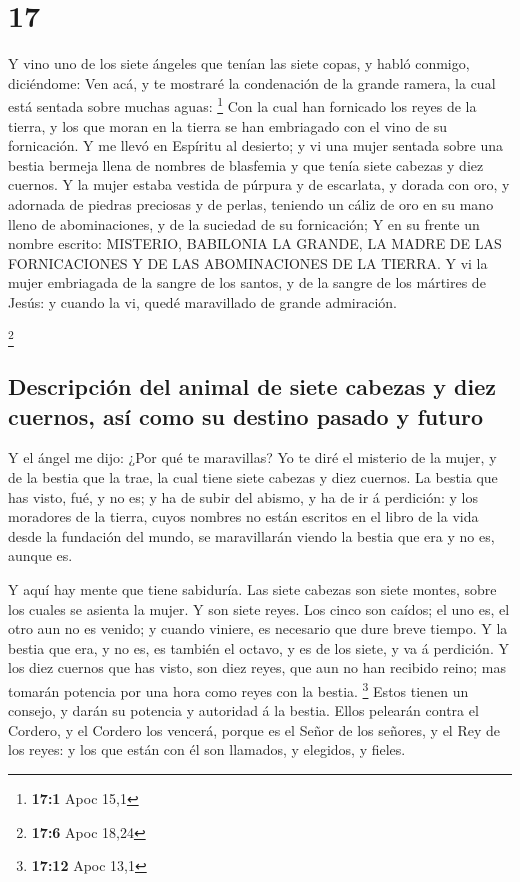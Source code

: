 \hypertarget{section-16}{%
\section{17}\label{section-16}}

 Y vino uno de los siete ángeles que tenían las siete copas,
y habló conmigo, diciéndome: Ven acá, y te mostraré la condenación de la
grande ramera, la cual está sentada sobre muchas aguas: \footnote{\textbf{17:1}
  Apoc 15,1}  Con la cual han fornicado los reyes de la
tierra, y los que moran en la tierra se han embriagado con el vino de su
fornicación.  Y me llevó en Espíritu al desierto; y vi una
mujer sentada sobre una bestia bermeja llena de nombres de blasfemia y
que tenía siete cabezas y diez cuernos.  Y la mujer estaba
vestida de púrpura y de escarlata, y dorada con oro, y adornada de
piedras preciosas y de perlas, teniendo un cáliz de oro en su mano lleno
de abominaciones, y de la suciedad de su fornicación;  Y en
su frente un nombre escrito: MISTERIO, BABILONIA LA GRANDE, LA MADRE DE
LAS FORNICACIONES Y DE LAS ABOMINACIONES DE LA TIERRA.  Y vi
la mujer embriagada de la sangre de los santos, y de la sangre de los
mártires de Jesús: y cuando la vi, quedé maravillado de grande
admiración.

\footnote{\textbf{17:6} Apoc 18,24}

\hypertarget{descripciuxf3n-del-animal-de-siete-cabezas-y-diez-cuernos-asuxed-como-su-destino-pasado-y-futuro}{%
\subsection{Descripción del animal de siete cabezas y diez cuernos, así
como su destino pasado y
futuro}\label{descripciuxf3n-del-animal-de-siete-cabezas-y-diez-cuernos-asuxed-como-su-destino-pasado-y-futuro}}

 Y el ángel me dijo: ¿Por qué te maravillas? Yo te diré el
misterio de la mujer, y de la bestia que la trae, la cual tiene siete
cabezas y diez cuernos.  La bestia que has visto, fué, y no
es; y ha de subir del abismo, y ha de ir á perdición: y los moradores de
la tierra, cuyos nombres no están escritos en el libro de la vida desde
la fundación del mundo, se maravillarán viendo la bestia que era y no
es, aunque es.

 Y aquí hay mente que tiene sabiduría. Las siete cabezas son
siete montes, sobre los cuales se asienta la mujer.  Y son
siete reyes. Los cinco son caídos; el uno es, el otro aun no es venido;
y cuando viniere, es necesario que dure breve tiempo.  Y la
bestia que era, y no es, es también el octavo, y es de los siete, y va á
perdición.  Y los diez cuernos que has visto, son diez
reyes, que aun no han recibido reino; mas tomarán potencia por una hora
como reyes con la bestia. \footnote{\textbf{17:12} Apoc 13,1}
 Estos tienen un consejo, y darán su potencia y autoridad á
la bestia.  Ellos pelearán contra el Cordero, y el Cordero
los vencerá, porque es el Señor de los señores, y el Rey de los reyes: y
los que están con él son llamados, y elegidos, y fieles.

